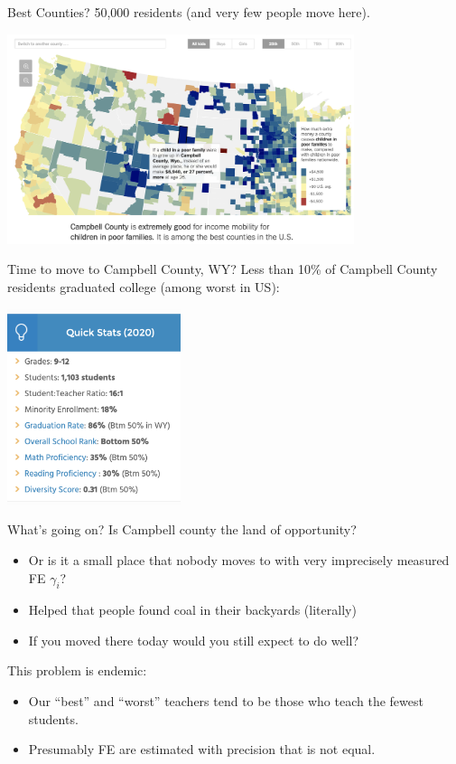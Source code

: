 \documentclass[xcolor=pdftex,dvipsnames,table,mathserif,aspectratio=169]{beamer}
\begin{document}
\begin{frame}{Best Counties?}
50,000 residents (and very few people move here).
\begin{center}
\includegraphics[width=4in]{./resources/chetty1.png}
\end{center}
\end{frame}


\begin{frame}{Time to move to Campbell County, WY?}
Less than 10\% of Campbell County residents graduated college (among worst in US):
\begin{center}
\includegraphics[width=2in]{./resources/chetty4.png}
\end{center}
\end{frame}


\begin{frame}{What's going on?}
Is Campbell county the land of opportunity?
\begin{itemize}
\item Or is it a small place that nobody moves to with very imprecisely measured FE $\gamma_i$?
\item Helped that people found coal in their backyards (literally)
\item If you moved there today would you still expect to do well?
\end{itemize}
This problem is endemic:
\begin{itemize}
\item Our ``best'' and ``worst'' teachers tend to be those who teach the fewest students.
\item Presumably FE are estimated with precision that is not equal.
\end{itemize}


\end{frame}
\end{document}
